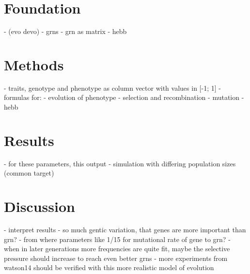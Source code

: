 \documentclass{article}
\begin{document}
\section{Foundation}

- (evo devo)
- grns
- grn as matrix
- hebb


\section{Methods}

- traits, genotype and phenotype as column vector with values in [-1; 1]
- formulas for:
	- evolution of phenotype
	- selection and recombination
	- mutation
	- hebb



\section{Results}

- for these parameters, this output
- simulation with differing population sizes (common target)

\section{Discussion}

- interpret results
- so much gentic variation, that genes are more important than grn?
- from where parameters like 1/15 for mutational rate of gene to grn?
- when in later generations more frequencies are quite fit, maybe the selective pressure should increase to reach even better grns
- more experiments from watson14 should be verified with this more realistic model of evolution

\newpage


\begin{appendix}
  \listoffigures
  \listoftables
\end{appendix}
\end{document}
